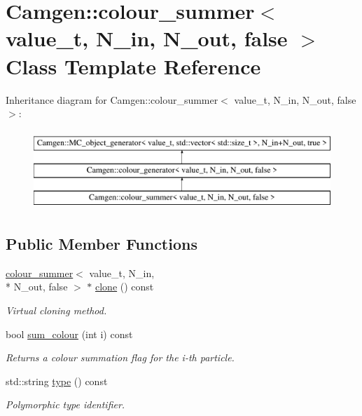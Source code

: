 \hypertarget{a00093}{\section{Camgen\-:\-:colour\-\_\-summer$<$ value\-\_\-t, N\-\_\-in, N\-\_\-out, false $>$ Class Template Reference}
\label{a00093}
}
Inheritance diagram for Camgen\-:\-:colour\-\_\-summer$<$ value\-\_\-t, N\-\_\-in, N\-\_\-out, false $>$\-:\begin{figure}[H]
\begin{center}
\leavevmode
\includegraphics[height=3.000000cm]{a00093}
\end{center}
\end{figure}
\subsection*{Public Member Functions}
\begin{DoxyCompactItemize}
\item 
\hypertarget{a00093_afb07031bf02960e818bacba52f4b5d02}{\hyperlink{a00092}{colour\-\_\-summer}$<$ value\-\_\-t, N\-\_\-in, \\*
N\-\_\-out, false $>$ $\ast$ \hyperlink{a00093_afb07031bf02960e818bacba52f4b5d02}{clone} () const }\label{a00093_afb07031bf02960e818bacba52f4b5d02}

\begin{DoxyCompactList}\small\item\em Virtual cloning method. \end{DoxyCompactList}\item 
bool \hyperlink{a00093_a1ab8045a6f4f9254f00de85c7d6e6e46}{sum\-\_\-colour} (int i) const 
\begin{DoxyCompactList}\small\item\em Returns a colour summation flag for the i-\/th particle. \end{DoxyCompactList}\item 
\hypertarget{a00093_ac9c77834f2f1ff0e19cf8b340ad2ceaf}{std\-::string \hyperlink{a00093_ac9c77834f2f1ff0e19cf8b340ad2ceaf}{type} () const }\label{a00093_ac9c77834f2f1ff0e19cf8b340ad2ceaf}

\begin{DoxyCompactList}\small\item\em Polymorphic type identifier. \end{DoxyCompactList}\end{DoxyCompactItemize}
